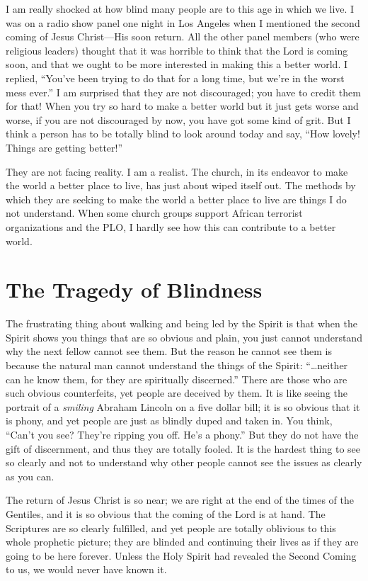 I am really shocked at how blind many people are to 
this age in which we live. I was on a radio show panel one 
night in Los Angeles when I mentioned the second coming 
of Jesus Christ—His soon return. All the other panel members (who were religious leaders) thought that it was horrible to think that the Lord is coming soon, and that we 
ought to be more interested in making this a better world. I 
replied, “You’ve been trying to do that for a long time, but 
we’re in the worst mess ever.” I am surprised that they are 
not discouraged; you have to credit them for that! When 
you try so hard to make a better world but it just gets worse 
and worse, if you are not discouraged by now, you have got 
some kind of grit. But I think a person has to be totally blind 
to look around today and say, “How lovely! Things are getting better!”

They are not facing reality. I am a realist. The church, in 
its endeavor to make the world a better place to live, has just 
about wiped itself out. The methods by which they are seeking to make the world a better place to live are things I do 
not understand. When some church groups support African
terrorist organizations and the PLO, I hardly see how this 
can contribute to a better world.


\section*{The Tragedy of Blindness}

The frustrating thing about walking and being led by 
the Spirit is that when the Spirit shows you things that are 
so obvious and plain, you just cannot understand why the 
next fellow cannot see them. But the reason he cannot see 
them is because the natural man cannot understand the 
things of the Spirit: “…neither can he know them, for they 
are spiritually discerned.” There are those who are such 
obvious counterfeits, yet people are deceived by them. It 
is like seeing the portrait of a \emph{smiling} Abraham Lincoln on 
a five dollar bill; it is so obvious that it is phony, and yet 
people are just as blindly duped and taken in. You think, 
“Can’t you see? They’re ripping you off. He’s a phony.” But 
they do not have the gift of discernment, and thus they are 
totally fooled. It is the hardest thing to see so clearly and 
not to understand why other people cannot see the issues as 
clearly as you can.

The return of Jesus Christ is so near; we are right at the 
end of the times of the Gentiles, and it is so obvious that 
the coming of the Lord is at hand. The Scriptures are so 
clearly fulfilled, and yet people are totally oblivious to this 
whole prophetic picture; they are blinded and continuing 
their lives as if they are going to be here forever. Unless 
the Holy Spirit had revealed the Second Coming to us, we 
would never have known it.


